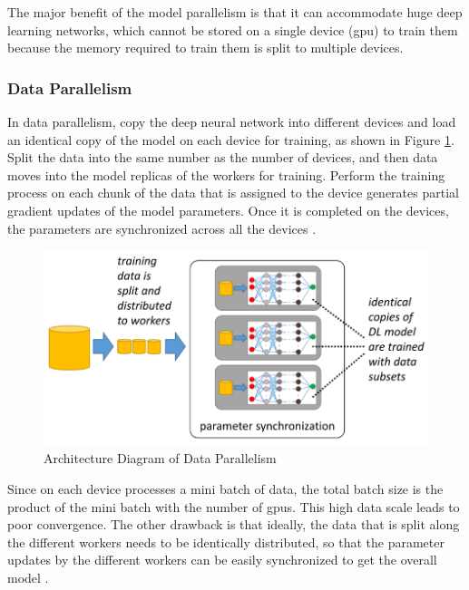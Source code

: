 The major benefit of the model parallelism is that it can accommodate huge deep learning networks, which cannot be stored on a single device (\acrshort{gpu}) to train them because the memory required to train them is split to multiple devices. 

\subsubsection{Data Parallelism}
In data parallelism, copy the deep neural network into different devices and load an identical copy of the model on each device for training, as shown in Figure \ref{fig:dataparallel}. Split the data into the same number as the number of devices, and then data moves into the model replicas of the workers for training. Perform the training process on each chunk of the data that is assigned to the device generates partial gradient updates of the model parameters. Once it is completed on the devices, the parameters are synchronized across all the devices \cite{Koliousis2019CROSSBOW:Servers}. 

\begin{figure}[ht]
  \begin{center}
    \includegraphics[width=\textwidth]{images/data parallelism.png} 
    \caption{Architecture Diagram of Data Parallelism  \cite{Mayer2020ScalableInfrastructures}}
    \label{fig:dataparallel}
  \end{center}
\end{figure}

Since on each device processes a mini batch of data, the total batch size is the product of the mini batch with the number of \acrshort{gpu}s. This high data scale leads to poor convergence. The other drawback is that ideally, the data that is split along the different workers needs to be identically distributed, so that the parameter updates by the different workers can be easily synchronized to get the overall model \cite{Jia2018BeyondNetworks}.

